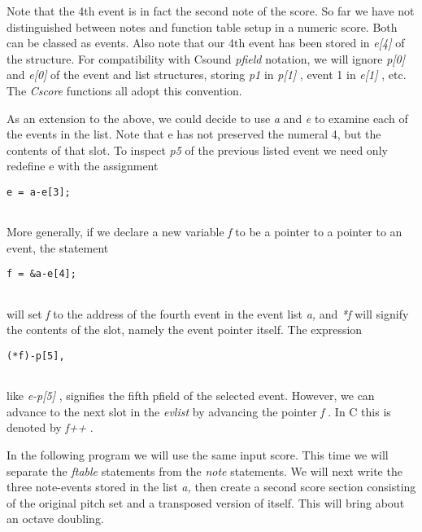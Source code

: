   Note that the 4th event is in fact the second note of the score. So far we have not distinguished between notes and function table setup in a numeric score. Both can be classed as events. Also note that our 4th event has been stored in \emph{e[4]}
 of the structure. For compatibility with Csound \emph{pfield}
 notation, we will ignore \emph{p[0]}
 and \emph{e[0]}
 of the event and list structures, storing \emph{p1}
 in \emph{p[1]}
, event 1 in \emph{e[1]}
, etc. The\emph{ Cscore }
functions all adopt this convention. 


  As an extension to the above, we could decide to use \emph{a}
 and \emph{e}
 to examine each of the events in the list. Note that e has not preserved the numeral 4, but the contents of that slot. To inspect \emph{p5}
 of the previous listed event we need only redefine e with the assignment 


 
\begin{lstlisting}
e = a-e[3];
      
\end{lstlisting}


 


  More generally, if we declare a new variable \emph{f }
to be a pointer to a pointer to an event, the statement 


 
\begin{lstlisting}
f = &a-e[4];
      
\end{lstlisting}


 
 will set \emph{f}
 to the address of the fourth event in the event list \emph{a,}
 and \emph{*f}
 will signify the contents of the slot, namely the event pointer itself. The expression 

 
\begin{lstlisting}
(*f)-p[5],
      
\end{lstlisting}


 
 like \emph{e-p[5]}
, signifies the fifth pfield of the selected event. However, we can advance to the next slot in the \emph{evlist}
 by advancing the pointer \emph{f}
. In C this is denoted by \emph{f++}
. 

  In the following program we will use the same input score. This time we will separate the \emph{ftable}
 statements from the \emph{note }
statements. We will next write the three note-events stored in the list\emph{ a,}
 then create a second score section consisting of the original pitch set and a transposed version of itself. This will bring about an octave doubling. 


